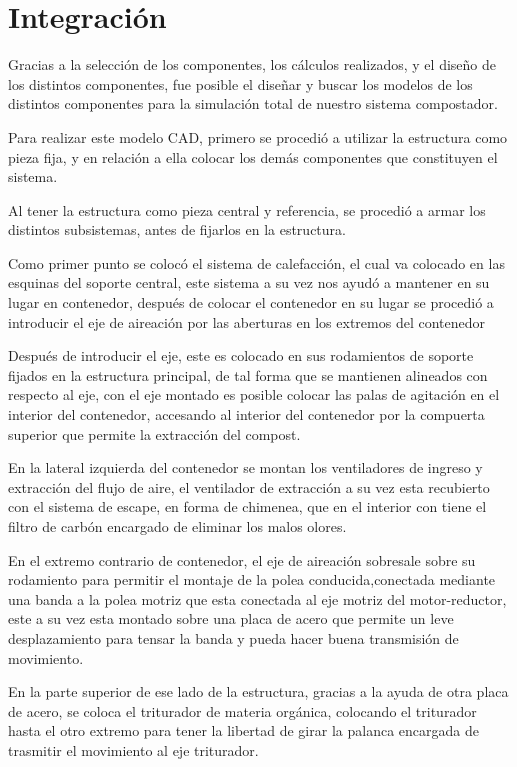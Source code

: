 \newpage

\section{Integración}

Gracias a la selección de los componentes, los cálculos realizados, y el diseño de los distintos componentes, fue posible el diseñar y buscar los modelos de los distintos componentes para la simulación total de nuestro sistema compostador.

Para realizar este modelo CAD, primero se procedió a utilizar la estructura como pieza fija, y en relación a ella colocar los demás componentes que constituyen el sistema.

Al tener la estructura como pieza central y referencia, se procedió a armar los distintos subsistemas, antes de fijarlos en la estructura.

Como primer punto se colocó el sistema de calefacción, el cual va colocado en las esquinas del soporte central, este sistema a su vez nos ayudó a mantener en su lugar en contenedor, después de colocar el contenedor en su lugar se procedió a introducir el eje de aireación por las aberturas en los extremos del contenedor

Después de introducir el eje, este es colocado en sus rodamientos de soporte fijados en la estructura principal, de tal forma que se mantienen alineados con respecto al eje, con el eje montado es posible colocar las palas de agitación en el interior del contenedor, accesando al interior del contenedor por la compuerta superior que permite la extracción del compost.

En la lateral izquierda del contenedor se montan los ventiladores de ingreso y extracción del flujo de aire, el ventilador de extracción a su vez esta recubierto con el sistema de escape, en forma de chimenea, que en el interior con tiene el filtro de carbón encargado de eliminar los malos olores.

En el extremo contrario de contenedor, el eje de aireación sobresale sobre su rodamiento para permitir el montaje de la polea conducida,conectada mediante una banda a la polea motriz que esta conectada al eje motriz del motor-reductor, este a su vez esta montado sobre una placa de acero que permite un leve desplazamiento para tensar la banda y pueda hacer buena transmisión de movimiento.

En la parte superior de ese lado de la estructura, gracias a la ayuda de otra placa de acero, se coloca el triturador de materia orgánica, colocando el triturador hasta el otro extremo para tener la libertad de girar la palanca encargada de trasmitir el movimiento al eje triturador.

